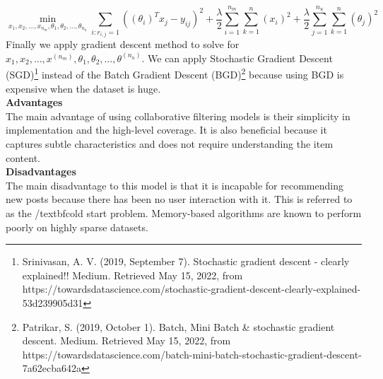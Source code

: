 \begin{equation*}
\min_{x_{1},x_{2}, \dots,x_{n_{m}}, \theta_{1},\theta_{2}, \dots, \theta_{n_{u}} } 
\sum_{i:r_{i,j} = 1}\left((\theta_{i})^{T}x_{j}-y_{ij}\right)^{2} + 
\frac{\lambda}{2}
\sum_{i=1}^{n_{m}}
\sum_{k = 1}^{n}(x_{i})^{2}+
\frac{\lambda}{2}
\sum_{j=1}^{n_{u}}
\sum_{k = 1}^{n}(\theta_{j})^{2}
\end{equation*}
Finally we apply gradient descent method to solve for $x_{1},x_{2}, \dots,x^{(n_{m})}, \theta_{1},\theta_{2}, \dots, \theta^{(n_{u})}$. We can apply Stochastic Gradient Descent (SGD)\footnote{Srinivasan, A. V. (2019, September 7). Stochastic gradient descent - clearly explained!! Medium. Retrieved May 15, 2022, from https://towardsdatascience.com/stochastic-gradient-descent-clearly-explained-53d239905d31 } instead of the Batch Gradient Descent (BGD)\footnote{Patrikar, S. (2019, October 1). Batch, Mini Batch \& stochastic gradient descent. Medium. Retrieved May 15, 2022, from https://towardsdatascience.com/batch-mini-batch-stochastic-gradient-descent-7a62ecba642a} because using BGD is expensive when the dataset is huge. 
\\\textbf{Advantages}
\\The main advantage of using collaborative filtering models is their simplicity in implementation and the high-level coverage. It is also beneficial because it captures subtle characteristics and does not require understanding the item content.
\\ \textbf{Disadvantages}
\\The main disadvantage to this model is that it is incapable  for recommending new posts because there has been no user interaction with it. This is referred to as the /textbf{cold start} problem. Memory-based algorithms are known to perform poorly on highly sparse datasets.



